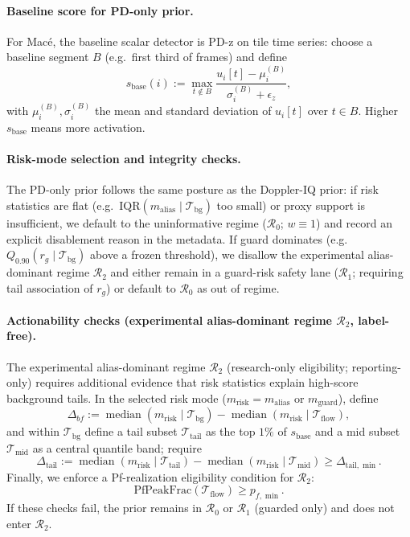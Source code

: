 \documentclass[11pt]{article}
\begin{document}
\paragraph{Baseline score for PD-only prior.}
For Mac{\'e}, the baseline scalar detector is PD-z on tile time series: choose a baseline segment $B$ (e.g.\ first third of frames) and define
\[
s_{\mathrm{base}}(i) := \max_{t\notin B} \frac{u_i[t]-\mu_i^{(B)}}{\sigma_i^{(B)}+\epsilon_z},
\]
with $\mu_i^{(B)},\sigma_i^{(B)}$ the mean and standard deviation of $u_i[t]$ over $t\in B$. Higher $s_{\mathrm{base}}$ means more activation.

\paragraph{Risk-mode selection and integrity checks.}
The PD-only prior follows the same posture as the Doppler-IQ prior:
if risk statistics are flat (e.g.\ $\mathrm{IQR}(m_{\mathrm{alias}}\mid\mathcal{T}_{\mathrm{bg}})$ too small) or proxy support is insufficient, we default to the uninformative regime ($\mathcal{R}_0$; $w\equiv 1$) and record an explicit disablement reason in the metadata. If guard dominates (e.g.\ $Q_{0.90}(r_g\mid\mathcal{T}_{\mathrm{bg}})$ above a frozen threshold), we disallow the experimental alias-dominant regime $\mathcal{R}_2$ and either remain in a guard-risk safety lane ($\mathcal{R}_1$; requiring tail association of $r_g$) or default to $\mathcal{R}_0$ as out of regime.

\paragraph{Actionability checks (experimental alias-dominant regime $\mathcal{R}_2$, label-free).}
The experimental alias-dominant regime $\mathcal{R}_2$ (research-only eligibility; reporting-only) requires additional evidence that risk statistics explain high-score background tails. In the selected risk mode ($m_{\mathrm{risk}}=m_{\mathrm{alias}}$ or $m_{\mathrm{guard}}$), define
\[
\Delta_{bf} := \operatorname{median}(m_{\mathrm{risk}}\mid\mathcal{T}_{\mathrm{bg}})-
               \operatorname{median}(m_{\mathrm{risk}}\mid\mathcal{T}_{\mathrm{flow}}),
\]
and within $\mathcal{T}_{\mathrm{bg}}$ define a tail subset $\mathcal{T}_{\mathrm{tail}}$ as the top $1\%$ of $s_{\mathrm{base}}$ and a mid subset $\mathcal{T}_{\mathrm{mid}}$ as a central quantile band; require
\[
\Delta_{\mathrm{tail}} := \operatorname{median}(m_{\mathrm{risk}}\mid\mathcal{T}_{\mathrm{tail}})-
                          \operatorname{median}(m_{\mathrm{risk}}\mid\mathcal{T}_{\mathrm{mid}})
                          \ge \Delta_{\mathrm{tail},\min}.
\]
Finally, we enforce a Pf-realization eligibility condition for $\mathcal{R}_2$:
\[
\mathrm{PfPeakFrac}(\mathcal{T}_{\mathrm{flow}})\ge p_{f,\min}.
\]
If these checks fail, the prior remains in $\mathcal{R}_0$ or $\mathcal{R}_1$ (guarded only) and does not enter $\mathcal{R}_2$.
\end{document}
